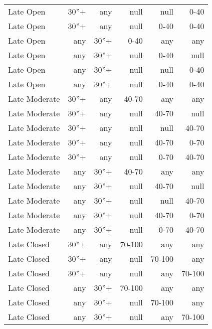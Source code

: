 \begin{table}[]
\begin{tabular}{@{}lrrrrr@{}}
Late Open        & 30''+           & any     & null   & null   & 0-40   \\
Late Open        & 30''+           & any     & null   & 0-40   & 0-40   \\
Late Open        & any            & 30''+    & 0-40   & any    & any    \\
Late Open        & any            & 30''+    & null   & 0-40   & null   \\
Late Open        & any            & 30''+    & null   & null   & 0-40   \\
Late Open        & any            & 30''+    & null   & 0-40   & 0-40   \\
Late Moderate    & 30''+           & any     & 40-70  & any    & any    \\
Late Moderate    & 30''+           & any     & null   & 40-70  & null   \\
Late Moderate    & 30''+           & any     & null   & null   & 40-70  \\
Late Moderate    & 30''+           & any     & null   & 40-70  & 0-70   \\
Late Moderate    & 30''+           & any     & null   & 0-70   & 40-70  \\
Late Moderate    & any            & 30''+    & 40-70  & any    & any    \\
Late Moderate    & any            & 30''+    & null   & 40-70  & null   \\
Late Moderate    & any            & 30''+    & null   & null   & 40-70  \\
Late Moderate    & any            & 30''+    & null   & 40-70  & 0-70   \\
Late Moderate    & any            & 30''+    & null   & 0-70   & 40-70  \\
Late Closed      & 30''+           & any     & 70-100 & any    & any    \\
Late Closed      & 30''+           & any     & null   & 70-100 & any    \\
Late Closed      & 30''+           & any     & null   & any    & 70-100 \\
Late Closed      & any            & 30''+    & 70-100 & any    & any    \\
Late Closed      & any            & 30''+    & null   & 70-100 & any    \\
Late Closed      & any            & 30''+    & null   & any    & 70-100 \\ \bottomrule
\end{tabular}
\end{table}

